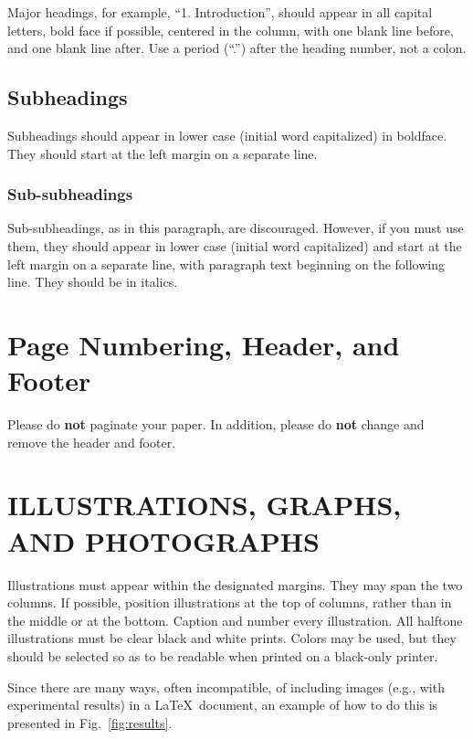\documentclass{article}
\begin{document}
\begin{sloppy}
Major headings, for example, ``1. Introduction'', should 
appear in all capital letters, bold face if possible, 
centered in the column, with one blank line before, 
and one blank line after. Use a period (``.'') after 
the heading number, not a colon.

\subsection{Subheadings}
\label{ssec:subhead}

Subheadings should appear in lower case (initial word 
capitalized) in boldface. They should start at the left 
margin on a separate line. 
 
\subsubsection{Sub-subheadings}
\label{sssec:subsubhead}

Sub-subheadings, as in this paragraph, are discouraged. 
However, if you must use them, they should appear in 
lower case (initial word capitalized) and start at the 
left margin on a separate line, with paragraph
text beginning on the following line. They should be 
in italics. 
 

\section{Page Numbering, Header, and Footer}
\label{sec:page}

Please do {\bf not} paginate your paper. 
In addition, please do {\bf not} change and remove
the header and footer.

\section{ILLUSTRATIONS, GRAPHS, AND PHOTOGRAPHS}
\label{sec:illust}

Illustrations must appear within the designated margins.  
They may span the two columns. If possible, position 
illustrations at the top of columns, rather than in 
the middle or at the bottom. Caption and number every 
illustration. All halftone illustrations must be clear 
black and white prints. Colors may be used, but they 
should be selected so as to be readable when printed 
on a black-only printer.

Since there are many ways, often incompatible, of 
including images (e.g., with experimental results) 
in a \LaTeX\ document, an example of how to do
this is presented in Fig.~\ref{fig:results}.


\end{sloppy}
\end{document}
